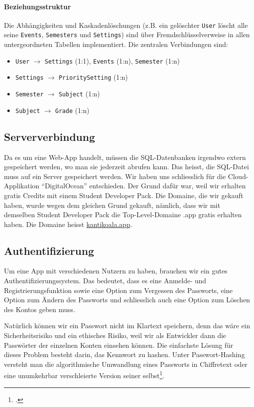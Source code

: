 \documentclass[12pt,a4paper]{report}
\begin{document}
\paragraph{Beziehungsstruktur}
Die Abhängigkeiten und Kaskadenlöschungen (z.B. ein gelöschter \texttt{User} löscht alle seine \texttt{Events}, \texttt{Semesters} und \texttt{Settings}) sind über Fremdschlüsselverweise in allen untergeordneten Tabellen implementiert. Die zentralen Verbindungen sind:
\begin{itemize}
    \item \texttt{User} $\to$ \texttt{Settings} (1:1), \texttt{Events} (1:n), \texttt{Semester} (1:n)
    \item \texttt{Settings} $\to$ \texttt{PrioritySetting} (1:n)
    \item \texttt{Semester} $\to$ \texttt{Subject} (1:n)
    \item \texttt{Subject} $\to$ \texttt{Grade} (1:n)
\end{itemize}

\subsection{Serververbindung}
Da es um eine Web-App handelt, müssen die SQL-Datenbanken irgendwo extern gespeichert werden, wo man sie jederzeit abrufen kann. Das heisst, die SQL-Datei muss auf ein Server gespeichert werden. Wir haben uns schliesslich für die Cloud-Applikation \enquote{DigitalOcean} entschieden. Der Grund dafür war, weil wir erhalten gratis Credits mit einem Student Developer Pack. Die Domaine, die wir gekauft haben, wurde wegen dem gleichen Grund gekauft, nämlich, dass wir mit demselben Student Developer Pack die Top-Level-Domaine .app gratis erhalten haben. Die Domaine heisst \href{https://www.kantikoala.app}{kantikoala.app}.

\subsection{Authentifizierung}
Um eine App mit verschiedenen Nutzern zu haben, brauchen wir ein gutes Authentifizierungssystem. Das bedeutet, dass es eine Anmelde- und Registrierungsfunktion sowie eine Option zum Vergessen des Passworts, eine Option zum Ändern des Passworts und schliesslich auch eine Option zum Löschen des Kontos geben muss. 

Natürlich können wir ein Passwort nicht im Klartext speichern, denn das wäre ein Sicherheitsrisiko und ein ethisches Risiko, weil wir als Entwickler dann die Passwörter der einzelnen Konten einsehen können. Die einfachste Lösung für dieses Problem besteht darin, das Kennwort zu hashen. Unter Passwort-Hashing versteht man die algorithmische Umwandlung eines Passworts in Chiffretext oder eine unumkehrbar verschleierte Version seiner selbst\footcite{password_hashing}. 
\end{document}
